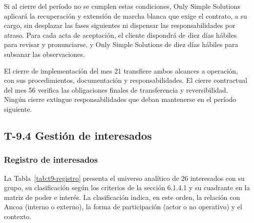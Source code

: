 \documentclass[11pt]{article}
\begin{document}
Si al cierre del período no se cumplen estas condiciones, Only Simple Solutions aplicará la recuperación y extensión de marcha blanca que exige el contrato, a su cargo, sin desplazar las fases siguientes ni dispensar las responsabilidades por atraso. Para cada acta de aceptación, el cliente dispondrá de diez días hábiles para revisar y pronunciarse, y Only Simple Solutions de diez días hábiles para subsanar las observaciones.

El cierre de implementación del mes 21 transfiere ambos alcances a operación, con sus procedimientos, documentación y responsabilidades. El cierre contractual del mes 56 verifica las obligaciones finales de transferencia y reversibilidad. Ningún cierre extingue responsabilidades que deban mantenerse en el período siguiente.

\subsection{T-9.4 Gestión de interesados}\label{t9-4}

\subsubsection{Registro de interesados}\label{t9-4-registro}

La Tabla~\mbox{\ref{tab:t9-registro}} presenta el universo analítico de 26 interesados con su grupo, su clasificación según los criterios de la sección 6.1.4.1 y su cuadrante en la matriz de poder e interés. La clasificación indica, en este orden, la relación con Ancoa (interno o externo), la forma de participación (actor o no operativo) y el contexto.
\end{document}
